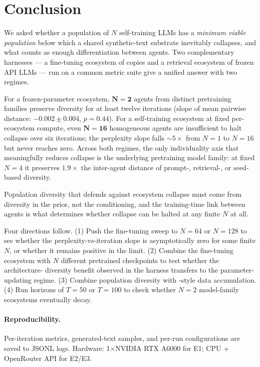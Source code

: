 \section{Conclusion}
\label{sec:conclusion}

We asked whether a population of $N$ self-training LLMs has a
\emph{minimum viable population} below which a shared synthetic-text
substrate inevitably collapses, and what counts as enough
differentiation between agents. Two complementary harnesses --- a
fine-tuning ecosystem of \distilgpt copies and a retrieval ecosystem
of frozen API LLMs --- run on a common metric suite give a unified
answer with two regimes.

For a frozen-parameter ecosystem, $\mathbf{N{=}2}$ agents from
distinct pretraining families preserve diversity for at least twelve
iterations (slope of mean pairwise distance: $-0.002 \pm 0.004$,
$p = 0.44$). For a self-training ecosystem at fixed per-ecosystem
compute, even $\mathbf{N{=}16}$ homogeneous agents are insufficient to
halt collapse over six iterations; the perplexity slope falls
$\sim 5\times$ from $N{=}1$ to $N{=}16$ but never reaches zero. Across
both regimes, the only individuality axis that meaningfully reduces
collapse is the underlying pretraining model family: at fixed $N{=}4$
it preserves $1.9\times$ the inter-agent distance of prompt-, retrieval-,
or seed-based diversity.

Population diversity that defends against ecosystem collapse must come
from diversity in the prior, not the conditioning, and the
training-time link between agents is what determines whether collapse
can be halted at any finite $N$ at all.

Four directions follow. (1) Push the fine-tuning sweep to $N{=}64$ or
$N{=}128$ to see whether the perplexity-vs-iteration slope is
asymptotically zero for some finite $N$, or whether it remains
positive in the limit. (2) Combine the fine-tuning ecosystem with
$N$ different pretrained checkpoints to test whether the architecture-
diversity benefit observed in the \rag harness transfers to the
parameter-updating regime. (3) Combine population diversity with
\citet{gerstgrasser2024accumulating}-style data accumulation. (4) Run
\rag horizons of $T{=}50$ or $T{=}100$ to check whether $N{=}2$
model-family ecosystems eventually decay.

\paragraph{Reproducibility.}
Per-iteration metrics, generated-text samples, and per-run
configurations are saved to JSONL logs. Hardware: 1$\times$NVIDIA
RTX A6000 for E1; CPU + OpenRouter API for E2/E3.

